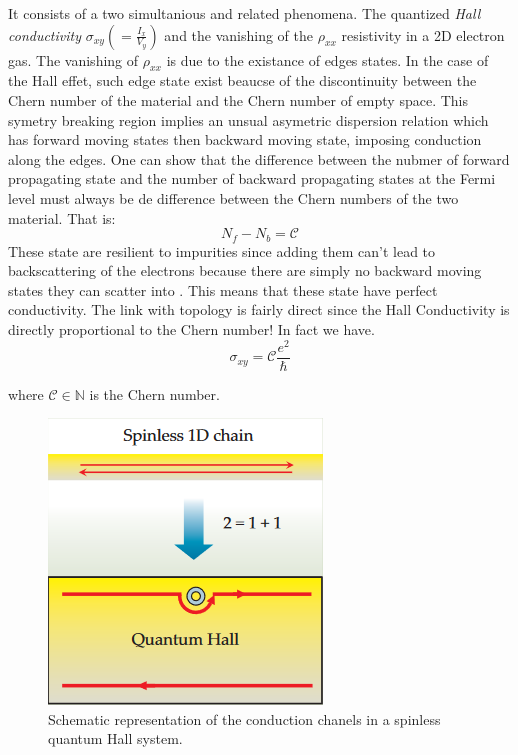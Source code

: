 It consists of a two simultanious and related phenomena. The quantized \textit{Hall conductivity} $\sigma_{xy}(=\frac{I_x}{V_y})$ and the vanishing of the $\rho_{xx}$ resistivity in a 2D electron gas. The vanishing of $\rho_{xx}$ is due to the existance of edges states.%
In the case of the Hall effet, such edge state exist beaucse of the discontinuity between the Chern number of the material and the Chern number of empty space. This symetry breaking region implies an unsual asymetric dispersion relation which has forward moving states then backward moving state, imposing conduction along the edges. One can show that the difference between the nubmer of forward  propagating state and the number of backward propagating states at the Fermi level must always be de difference between the Chern numbers of the two material\cite{kane_topological_2013}. That is: $$N_f -N_b = \mathcal{C}$$ These state are resilient to impurities since adding them can't lead to backscattering of the electrons because there are simply no backward moving states they can scatter into \cite{qi_quantum_2010}. This means that these state have perfect conductivity.  The link with topology is fairly direct since the Hall Conductivity is directly proportional to the Chern number! In fact we have.
\begin{equation}
\sigma_{xy} = \mathcal{C}\frac{e^2}{\hbar}
\end{equation}

where $\mathcal{C} \in \mathbb{N}$ is the Chern number.

\begin{figure}[h!]
    \includegraphics[scale = 0.7]{sections/visuel/spinless.png}
    \caption{Schematic representation of the conduction chanels in a spinless quantum Hall system.\cite{qi_quantum_2010}}
    \label{spinless}
\end{figure}




